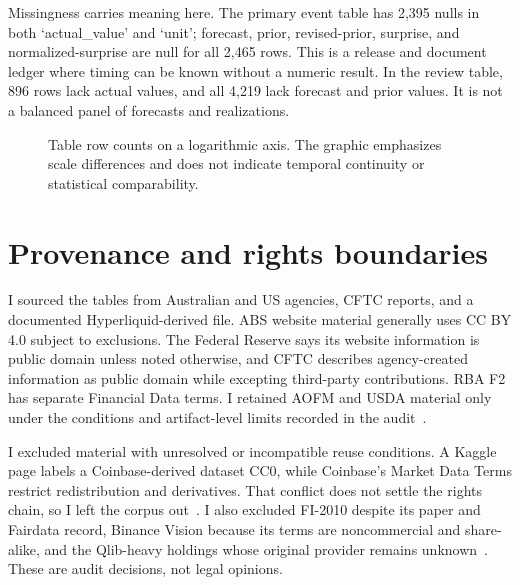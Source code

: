 \documentclass[10pt]{article}
\begin{document}
Missingness carries meaning here. The primary event table has 2,395 nulls in both `actual\_value' and `unit'; forecast, prior, revised-prior, surprise, and normalized-surprise are null for all 2,465 rows. This is a release and document ledger where timing can be known without a numeric result. In the review table, 896 rows lack actual values, and all 4,219 lack forecast and prior values. It is not a balanced panel of forecasts and realizations.

\begin{figure}[t]
\centering
{}
\caption{Table row counts on a logarithmic axis. The graphic emphasizes scale differences and does not indicate temporal continuity or statistical comparability.}
\label{fig:rows}
\end{figure}

\section{Provenance and rights boundaries}
I sourced the tables from Australian and US agencies, CFTC reports, and a documented Hyperliquid-derived file. ABS website material generally uses CC BY 4.0 subject to exclusions. The Federal Reserve says its website information is public domain unless noted otherwise, and CFTC describes agency-created information as public domain while excepting third-party contributions. RBA F2 has separate Financial Data terms. I retained AOFM and USDA material only under the conditions and artifact-level limits recorded in the audit~\cite{absrights,fedrights,aofmrights,usdarecord,nalrights}.

I excluded material with unresolved or incompatible reuse conditions. A Kaggle page labels a Coinbase-derived dataset CC0, while Coinbase's Market Data Terms restrict redistribution and derivatives. That conflict does not settle the rights chain, so I left the corpus out~\cite{coinbasekaggle,coinbaseterms}. I also excluded FI-2010 despite its paper and Fairdata record, Binance Vision because its terms are noncommercial and share-alike, and the Qlib-heavy holdings whose original provider remains unknown~\cite{ntakaris2018,fi2010fairdata,binanceterms}. These are audit decisions, not legal opinions.
\end{document}
